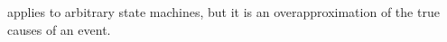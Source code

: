 applies to arbitrary state machines, but it is an
overapproximation of the true causes of an event.

\vspace{0.5in}


